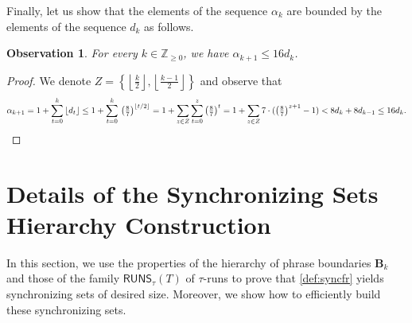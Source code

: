 \documentclass[a4paper]{article}
\newtheorem{observation}[theorem]{Observation}
\theoremstyle{definition}
\theoremstyle{remark}
\newcommand{\Zz}{\mathbb{Z}_{\ge 0}}
\newcommand{\B}{\mathbf{B}}
\newcommand{\floor}[1]{\left\lfloor #1 \right\rfloor}
\newcommand{\osiemsiedem}{\left(\tfrac{8}{7}\right)}
\newcommand{\RUNS}{\mathsf{RUNS}}
\begin{document}
Finally, let us show that the elements of the sequence $\alpha_k$ are bounded by the elements of the sequence $d_k$ as follows.
\begin{observation}\label{obs:d_alpha}
For every $k\in \Zz$, we have $\alpha_{k+1} \le 16d_{k}$.
\end{observation}
\begin{proof}
We denote $Z=\left\{\floor{\tfrac{k}{2}},\floor{\tfrac{k-1}{2}}\right\}$ and observe that
 \[\alpha_{k+1}= 1 + \sum_{t=0}^k \floor{d_t} \le 1+\sum_{t=0}^{k}\,\osiemsiedem^{\floor{t/2}} = 1+\sum_{z \in Z}\sum_{t=0}^z \osiemsiedem^{t}
= 1+\sum_{z \in Z} 7\cdot (\osiemsiedem^{z+1}-1)
< 8d_{k}+8d_{k-1} \le 16d_{k}.\qedhere\]
\end{proof}

\section{Details of the Synchronizing Sets Hierarchy Construction}\label{sec:correctness}

In this section, we use the properties of the hierarchy of phrase boundaries $\B_k$ and those of the family $\RUNS_\tau(T)$ of $\tau$-runs to prove that \cref{def:syncfr} yields synchronizing sets of desired size. Moreover, we show how to efficiently build these synchronizing sets.
\end{document}

